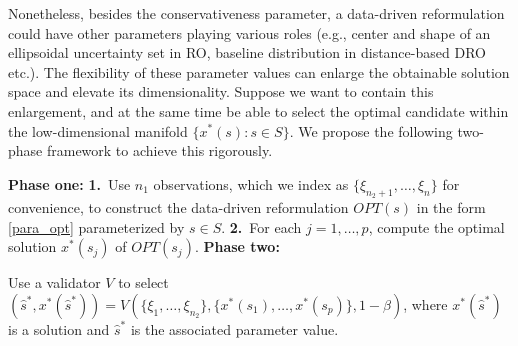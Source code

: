 \documentclass[mnsc,blindrev]{informs4} %
\newcommand{\prth}[1]{\left(#1\right)}
\begin{document}
Nonetheless, besides the conservativeness parameter, a data-driven reformulation could have other parameters playing various roles (e.g., center and shape of an ellipsoidal uncertainty set in RO, baseline distribution in distance-based DRO etc.). The flexibility of these parameter values can enlarge the obtainable solution space and elevate its dimensionality. Suppose we want to contain this enlargement, and at the same time be able to select the optimal candidate within the low-dimensional manifold $\{x^*(s):s\in S\}$. We propose the following two-phase framework to achieve this rigorously.

\begin{algorithm}
\caption{The Two-Phase Framework}
\label{two-phase framework}
\begin{algorithmic}
\vspace{1ex}
\STATE\textbf{Phase one:}
\STATE \textbf{1.}~Use $n_1$ observations, which we index as $\{\xi_{n_2+1},\ldots,\xi_{n}\}$ for convenience, to construct the data-driven reformulation $OPT(s)$ in the form \eqref{para_opt} parameterized by $s\in S$.
\STATE \textbf{2.}~For each $j=1,\ldots,p$, compute the optimal solution $x^*(s_j)$ of $OPT(s_j)$.
\vspace{1ex}
\STATE \textbf{Phase two:}

Use a validator $V$ to select $(\hat s^*,x^*(\hat s^*))= V(\{\xi_1,\ldots,\xi_{n_2}\},\{x^*(s_1),\ldots,x^*(s_p)\},1-\beta)$, where $x^*(\hat s^*)$ is a solution and $\hat s^*$ is the associated parameter value.

\vspace{1ex}
\end{algorithmic}
\end{algorithm}

\end{document}
